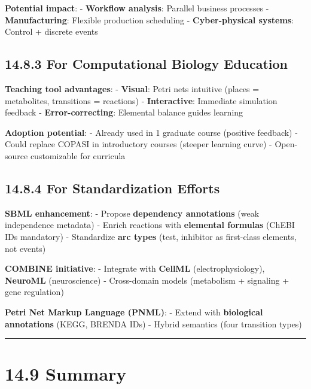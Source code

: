 \textbf{Potential impact}: - \textbf{Workflow analysis}: Parallel
business processes - \textbf{Manufacturing}: Flexible production
scheduling - \textbf{Cyber-physical systems}: Control + discrete events

\hypertarget{for-computational-biology-education}{%
\subsection{14.8.3 For Computational Biology
Education}\label{for-computational-biology-education}}

\textbf{Teaching tool advantages}: - \textbf{Visual}: Petri nets
intuitive (places = metabolites, transitions = reactions) -
\textbf{Interactive}: Immediate simulation feedback -
\textbf{Error-correcting}: Elemental balance guides learning

\textbf{Adoption potential}: - Already used in 1 graduate course
(positive feedback) - Could replace COPASI in introductory courses
(steeper learning curve) - Open-source \textrightarrow customizable for curricula

\hypertarget{for-standardization-efforts}{%
\subsection{14.8.4 For Standardization
Efforts}\label{for-standardization-efforts}}

\textbf{SBML enhancement}: - Propose \textbf{dependency annotations}
(weak independence metadata) - Enrich reactions with \textbf{elemental
formulas} (ChEBI IDs mandatory) - Standardize \textbf{arc types} (test,
inhibitor as first-class elements, not events)

\textbf{COMBINE initiative}: - Integrate with \textbf{CellML}
(electrophysiology), \textbf{NeuroML} (neuroscience) - Cross-domain
models (metabolism + signaling + gene regulation)

\textbf{Petri Net Markup Language (PNML)}: - Extend with
\textbf{biological annotations} (KEGG, BRENDA IDs) - Hybrid semantics
(four transition types)

\begin{center}\rule{0.5\linewidth}{0.5pt}\end{center}

\hypertarget{summary}{%
\section{14.9 Summary}\label{summary}}

